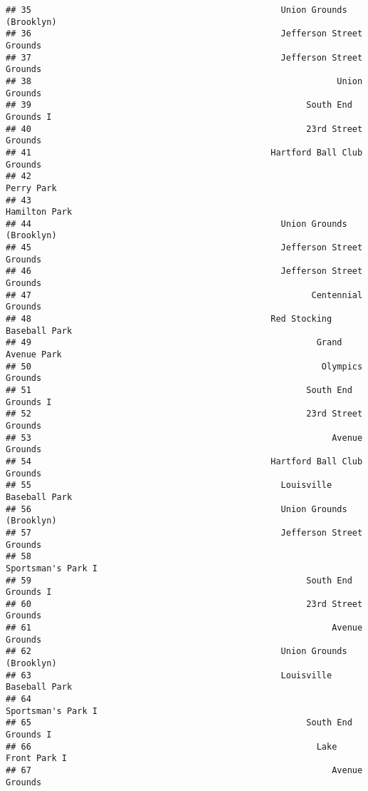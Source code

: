 \documentclass[]{article}
\begin{document}
\begin{verbatim}
## 35                                                 Union Grounds (Brooklyn)
## 36                                                 Jefferson Street Grounds
## 37                                                 Jefferson Street Grounds
## 38                                                            Union Grounds
## 39                                                      South End Grounds I
## 40                                                      23rd Street Grounds
## 41                                               Hartford Ball Club Grounds
## 42                                                               Perry Park
## 43                                                            Hamilton Park
## 44                                                 Union Grounds (Brooklyn)
## 45                                                 Jefferson Street Grounds
## 46                                                 Jefferson Street Grounds
## 47                                                       Centennial Grounds
## 48                                               Red Stocking Baseball Park
## 49                                                        Grand Avenue Park
## 50                                                         Olympics Grounds
## 51                                                      South End Grounds I
## 52                                                      23rd Street Grounds
## 53                                                           Avenue Grounds
## 54                                               Hartford Ball Club Grounds
## 55                                                 Louisville Baseball Park
## 56                                                 Union Grounds (Brooklyn)
## 57                                                 Jefferson Street Grounds
## 58                                                       Sportsman's Park I
## 59                                                      South End Grounds I
## 60                                                      23rd Street Grounds
## 61                                                           Avenue Grounds
## 62                                                 Union Grounds (Brooklyn)
## 63                                                 Louisville Baseball Park
## 64                                                       Sportsman's Park I
## 65                                                      South End Grounds I
## 66                                                        Lake Front Park I
## 67                                                           Avenue Grounds

\end{verbatim}
\end{document}

